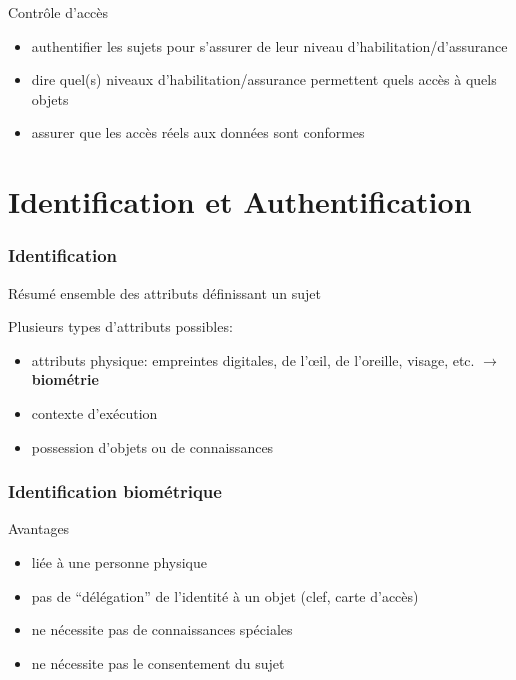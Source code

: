 \begin{reveals}
\begin{frame}
  \vfill

  \begin{block}{Contrôle d'accès}
    \begin{itemize}
    \item authentifier les sujets pour s'assurer de leur niveau d'habilitation/d'assurance
    \item dire quel(s) niveaux d'habilitation/assurance permettent quels accès à quels objets
    \item assurer que les accès réels aux données sont conformes 
    \end{itemize}
  \end{block}

  \vfill

\end{frame}


\section{Identification et Authentification}
 
\begin{frame}
  \frametitle{Identification}

  \vfill

  \begin{block}{Résumé}
    ensemble des attributs définissant un sujet
  \end{block}

  \vfill

  \begin{block}{Plusieurs types d'attributs possibles:}
    \begin{itemize}
    \item attributs physique: empreintes digitales, de l'\oe il, de
      l'oreille, visage, etc. \(\rightarrow\) \textbf{biométrie}
    \item contexte d'exécution
    \item possession d'objets ou de connaissances
    \end{itemize}
  \end{block}

\end{frame}

\begin{frame}
  \frametitle{Identification biométrique}

  \vfill

  \begin{block}{Avantages}
    \begin{itemize}
    \item liée à une personne physique 
    \item pas de ``délégation'' de l'identité à un objet (clef, carte d'accès)
    \item ne nécessite pas de connaissances spéciales
    \item ne nécessite pas le consentement du sujet
    \end{itemize}
  \end{block}


\end{frame}
\end{reveals}
